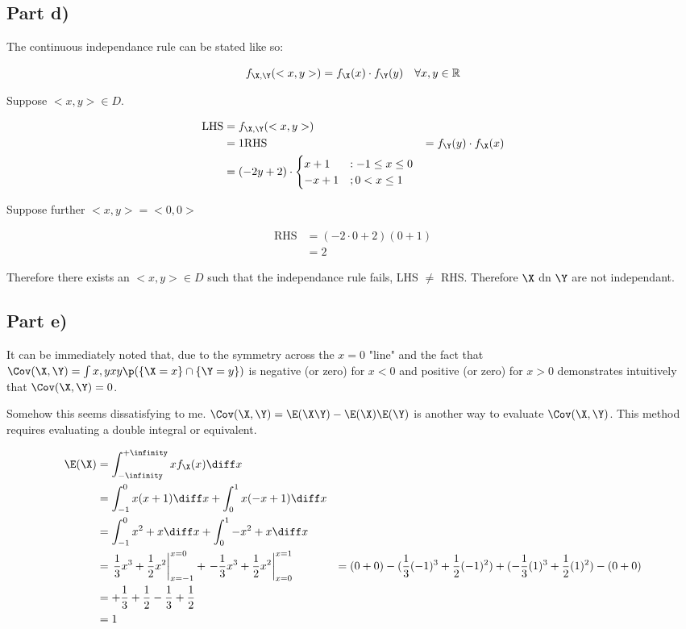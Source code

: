 \subsection{Part d)}

The continuous independance rule can be stated like so:

\begin{equation*}
f_{\X, \Y}(<x, y>) = f_\X(x) \cdot f_\Y(y) \quad \forall x,y\in \mathbb{R}
\end{equation*}

Suppose $<x, y> \in D$.

\begin{align*}
\text{LHS} &= f_{\X, \Y}(<x, y>) \\
&= 1
\text{RHS} &= f_\Y(y) \cdot f_\X(x) \\
&= (-2y + 2) \cdot \begin{cases}
x + 1 &: -1 \leq x \leq 0 \\
-x + 1 &; 0 < x \leq 1 \\
\end{cases}
\end{align*}

Suppose further $<x, y> = <0, 0>$

\begin{align*}
\text{RHS} &= (-2 \cdot 0 + 2)(0 + 1) \\
&= 2
\end{align*}

Therefore there exists an $<x, y> \in D$ such that the independance rule fails, LHS $\neq$ RHS.
Therefore $\X$ dn $\Y$ are not independant.

\subsection{Part e)}

It can be immediately noted that, due to the symmetry across the $x=0$ "line" and the fact that $\Cov(\X, \Y) = \int \limits {x,y}xy\p(\{ \X = x\} \cap \{ \Y = y \})$
is negative (or zero) for $x < 0$ and positive (or zero) for $x > 0$ demonstrates intuitively that $\Cov(\X, \Y) = 0$.

Somehow this seems dissatisfying to me.
$\Cov(\X, \Y) = \E(\X\Y) - \E(\X)\E(\Y)$ is another way to evaluate $\Cov(\X, \Y)$.
This method requires evaluating a double integral or equivalent.

\begin{align*}
\E(\X) &= \int _{-\infinity} ^{+\infinity} x f_\X(x) \diff x \\
&= \int _{-1} ^0 x(x+1)\diff x + \int _0 ^1 x(-x + 1) \diff x \\
&= \int _{-1} ^0 x^2+x \diff x + \int _0 ^{1} -x^2 + x \diff x \\
&= \left. \frac{1}{3}x^3 + \frac{1}{2}x^2 \right|^{x=0}_{x=-1} +
\left. -\frac{1}{3}x^3 + \frac{1}{2}x^2 \right|^{x=1}_{x=0}
&= (0 + 0) - (\frac{1}{3}(-1)^3 + \frac{1}{2}(-1)^2) +
(-\frac{1}{3}(1)^3 + \frac{1}{2}(1)^2) - (0 + 0) \\
&= +\frac{1}{3} + \frac{1}{2} - \frac{1}{3} + \frac{1}{2} \\
&= 1
\end{align*}

